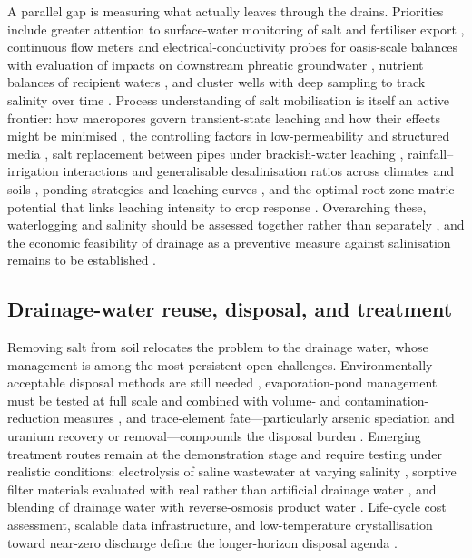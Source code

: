 \documentclass[11pt]{article}
\begin{document}
A parallel gap is measuring what actually leaves through the drains. Priorities
include greater attention to surface-water monitoring of salt and fertiliser
export \parencite{Mastrocicco2013}, continuous flow meters and
electrical-conductivity probes for oasis-scale balances with evaluation of
impacts on downstream phreatic groundwater \parencite{Askri2022}, nutrient
balances of recipient waters \parencite{Turtola1995}, and cluster wells with
deep sampling to track salinity over time \parencite{Singh2020d,Gafni2001}.
Process understanding of salt mobilisation is itself an active frontier: how
macropores govern transient-state leaching and how their effects might be
minimised \parencite{Xin2016}, the controlling factors in low-permeability and
structured media \parencite{Zhang2022}, salt replacement between pipes under
brackish-water leaching \parencite{Li2023}, rainfall--irrigation interactions
and generalisable desalinisation ratios across climates and soils
\parencite{Yu2015,Chen2025,Wang2024d}, ponding strategies and leaching curves
\parencite{RAO1991,Yang2022c}, and the optimal root-zone matric potential that
links leaching intensity to crop response \parencite{Zhang2021,Heng2021}.
Overarching these, waterlogging and salinity should be assessed together rather
than separately \parencite{Valipour2014}, and the economic feasibility of
drainage as a preventive measure against salinisation remains to be established
\parencite{Datta2000,HalbacCotoaraZamfir2022}.

\subsection{Drainage-water reuse, disposal, and treatment}

Removing salt from soil relocates the problem to the drainage water, whose
management is among the most persistent open challenges. Environmentally
acceptable disposal methods are still needed \parencite{Ayars2014,Steppuhn2006},
evaporation-pond management must be tested at full scale and combined with
volume- and contamination-reduction measures \parencite{BRADFORD1991}, and
trace-element fate---particularly arsenic speciation and uranium recovery or
removal---compounds the disposal burden \parencite{Gao2007,Duff1997,Gao2003}.
Emerging treatment routes remain at the demonstration stage and require testing
under realistic conditions: electrolysis of saline wastewater at varying
salinity \parencite{Yang2023}, sorptive filter materials evaluated with real
rather than artificial drainage water \parencite{Pugliese2023}, and blending of
drainage water with reverse-osmosis product water \parencite{Singh2020d}.
Life-cycle cost assessment, scalable data infrastructure, and low-temperature
crystallisation toward near-zero discharge define the longer-horizon disposal
agenda \parencite{Qin2025}.
\end{document}
